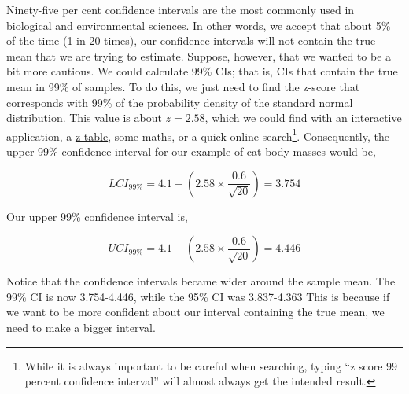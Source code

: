 \documentclass[
  openany]{scrbook}
\begin{document}
Ninety-five per cent confidence intervals are the most commonly used in biological and environmental sciences.
In other words, we accept that about 5\% of the time (1 in 20 times), our confidence intervals will not contain the true mean that we are trying to estimate.
Suppose, however, that we wanted to be a bit more cautious.
We could calculate 99\% CIs; that is, CIs that contain the true mean in 99\% of samples.
To do this, we just need to find the z-score that corresponds with 99\% of the probability density of the standard normal distribution.
This value is about \(z = 2.58\), which we could find with an interactive application, a \href{https://www.z-table.com/}{z table}, some maths, or a quick online search\footnote{While it is always important to be careful when searching, typing ``z score 99 percent confidence interval'' will almost always get the intended result.}.
Consequently, the upper 99\% confidence interval for our example of cat body masses would be,

\[LCI_{99\%} = 4.1 - \left(2.58 \times \frac{0.6}{\sqrt{20}}\right) = 3.754\]

Our upper 99\% confidence interval is,

\[UCI_{99\%} = 4.1 + \left(2.58 \times \frac{0.6}{\sqrt{20}}\right) = 4.446\]

Notice that the confidence intervals became wider around the sample mean.
The 99\% CI is now 3.754-4.446, while the 95\% CI was 3.837-4.363
This is because if we want to be more confident about our interval containing the true mean, we need to make a bigger interval.
\end{document}
